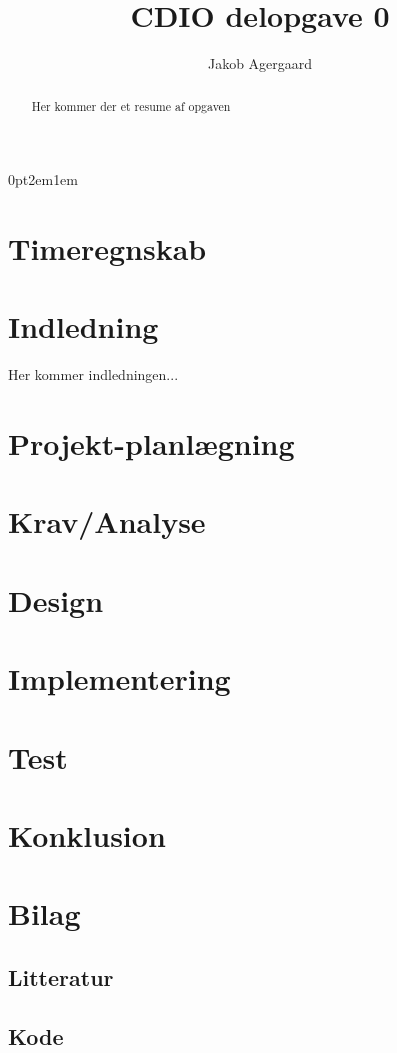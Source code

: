 \documentclass{article}
\title{CDIO delopgave 0}
\author{Jakob Agergaard}
\begin{document}
\titlespacing{\section}
    {0pt}{2em}{1em}



\normalsize
\begin{abstract}
     Her kommer der et resume af opgaven
\end{abstract}

\tableofcontents

\section{Timeregnskab}

\section{Indledning}

Her kommer indledningen...

\section{Projekt-planlægning}

\section{Krav/Analyse}

\section{Design}

\section{Implementering}

\section{Test}

\section{Konklusion}

\section{Bilag}
\subsection{Litteratur}
\subsection{Kode}
\end{document}
